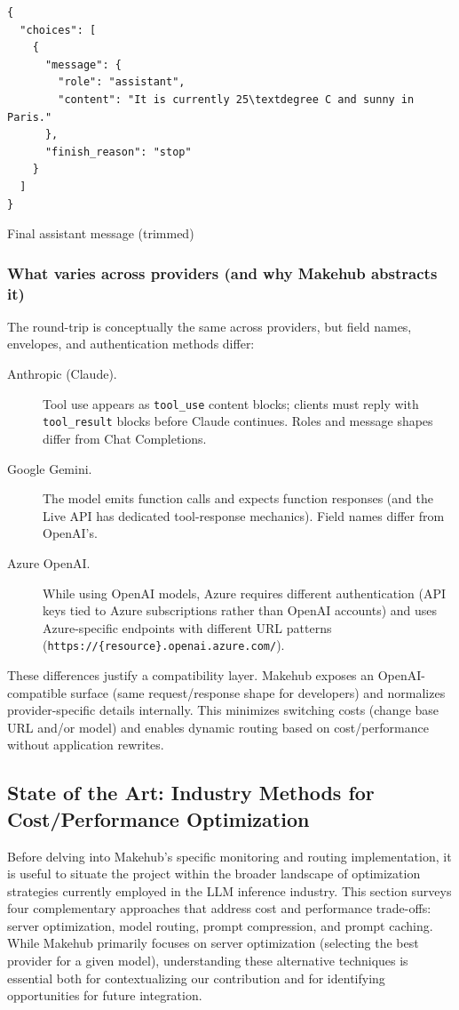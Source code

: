 \documentclass[english]{article}
\begin{document}
\begin{listing}[H]
\begin{verbatim}
{
  "choices": [
    {
      "message": {
        "role": "assistant",
        "content": "It is currently 25\textdegree C and sunny in Paris."
      },
      "finish_reason": "stop"
    }
  ]
}
\end{verbatim}
\caption{Final assistant message (trimmed)}
\end{listing}


\subsubsection{What varies across providers (and why Makehub abstracts it)}

The round-trip is conceptually the same across providers, but field names, envelopes, and authentication methods differ:
\begin{description}
  \item[Anthropic (Claude).] Tool use appears as \texttt{tool\_use} content blocks; clients must reply with \texttt{tool\_result} blocks before Claude continues. Roles and message shapes differ from Chat Completions.
  \item[Google Gemini.] The model emits function calls and expects function responses (and the Live API has dedicated tool-response mechanics). Field names differ from OpenAI's.
  \item[Azure OpenAI.] While using OpenAI models, Azure requires different authentication (API keys tied to Azure subscriptions rather than OpenAI accounts) and uses Azure-specific endpoints with different URL patterns (\texttt{https://\{resource\}.openai.azure.com/}).
\end{description}

These differences justify a compatibility layer. Makehub exposes an OpenAI-compatible surface (same request/response shape for developers) and normalizes provider-specific details internally. This minimizes switching costs (change base URL and/or model) and enables dynamic routing based on cost/performance without application rewrites.



\subsection{State of the Art: Industry Methods for Cost/Performance Optimization}

Before delving into Makehub's specific monitoring and routing implementation, it is useful to situate the project within the broader landscape of optimization strategies currently employed in the LLM inference industry. This section surveys four complementary approaches that address cost and performance trade-offs: server optimization, model routing, prompt compression, and prompt caching. While Makehub primarily focuses on server optimization (selecting the best provider for a given model), understanding these alternative techniques is essential both for contextualizing our contribution and for identifying opportunities for future integration.
\end{document}
